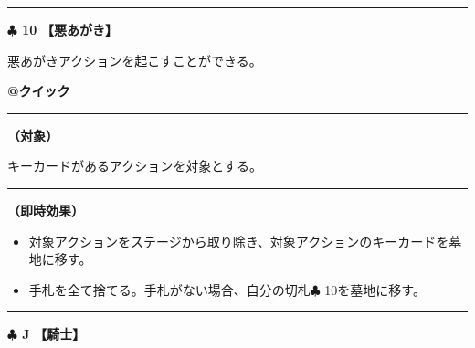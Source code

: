 \documentclass[twocolumn,a5paper,papersize,10pt]{jarticle}
\begin{document}
 

\vspace{3mm} %
\hrule height 0.5mm depth 0mm width 66.5mm %
\vspace{1mm} %
{\Large\bf $\clubsuit$ 10} {\normalsize\bf【悪あがき】} %
\vspace{1mm} %

悪あがきアクションを起こすことができる。

\begin{tcolorbox}[title={\small\bf【Action】悪あがき}{\scriptsize （速攻魔法）}]

{\scriptsize\bf @クイック }

\vspace{1mm} %
\hrule height 0.1mm depth 0mm width 62mm %
\vspace{1mm} %

{\bf（対象）}

キーカードがあるアクションを対象とする。

\vspace{1mm} %
\hrule height 0.1mm depth 0mm width 62mm %
\vspace{1mm} %

{\bf（即時効果）}


\vspace{-1zh}%
\begin{itemize}
\setlength{\leftskip}{-0.3cm}
\setlength{\parskip}{0pt} %

\item 対象アクションをステージから取り除き、対象アクションのキーカードを墓地に移す。

\item 手札を全て捨てる。手札がない場合、自分の切札{\normalsize $\clubsuit$} 10を墓地に移す。
\vspace{-1zh}%
\end{itemize}

\vspace{1mm} %
\end{tcolorbox}

\vspace{-1zh}
  
 

\vspace{3mm} %
\hrule height 0.5mm depth 0mm width 66.5mm %
\vspace{1mm} %
{\Large\bf $\clubsuit$ J} {\normalsize\bf【騎士】} %
\vspace{1mm} %
\end{document}
